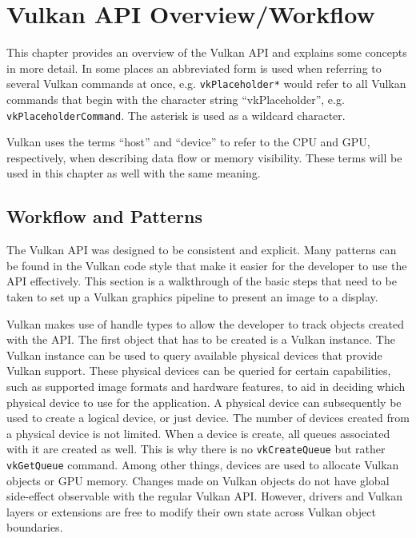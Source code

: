 
\chapter{Vulkan API Overview/Workflow}
\label{cha:VulkanOverview}

  This chapter provides an overview of the Vulkan API and explains some concepts in more detail. In some places an abbreviated form is used when referring to several Vulkan commands at once, e.g. \lstinline{vkPlaceholder*} would refer to all Vulkan commands that begin with the character string ``vkPlaceholder'', e.g. \lstinline{vkPlaceholderCommand}. The asterisk is used as a wildcard character.

  Vulkan uses the terms ``host'' and ``device'' to refer to the CPU and GPU, respectively, when describing data flow or memory visibility. These terms will be used in this chapter as well with the same meaning.

  \section{Workflow and Patterns}
  \label{sec:WorkflowAndPatterns}
    The Vulkan API was designed to be consistent and explicit. Many patterns can be found in the Vulkan code style that make it easier for the developer to use the API effectively. This section is a walkthrough of the basic steps that need to be taken to set up a Vulkan graphics pipeline to present an image to a display.

    Vulkan makes use of handle types to allow the developer to track objects created with the API. The first object that has to be created is a Vulkan instance. The Vulkan instance can be used to query available physical devices that provide Vulkan support. These physical devices can be queried for certain capabilities, such as supported image formats and hardware features, to aid in deciding which physical device to use for the application. A physical device can subsequently be used to create a logical device, or just device. The number of devices created from a physical device is not limited. When a device is create, all queues associated with it are created as well. This is why there is no \lstinline{vkCreateQueue} but rather \lstinline{vkGetQueue} command. Among other things, devices are used to allocate Vulkan objects or GPU memory. Changes made on Vulkan objects do not have global side-effect observable with the regular Vulkan API. However, drivers and Vulkan layers or extensions are free to modify their own state across Vulkan object boundaries.

